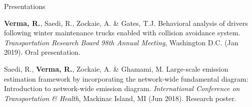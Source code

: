 \documentclass{CV} %
\begin{document}
\begin{rSection}{Presentations}
\begin{etaremune}
        \item \textbf{Verma, R.}, Saedi, R., Zockaie, A. \& Gates, T.J. Behavioral analysis of drivers following winter maintenance trucks enabled with collision avoidance system. \textit{Transportation Research Board 98th Annual Meeting}, Washington D.C. (Jan 2019). Oral presentation.

        \item Saedi, R., \textbf{Verma, R.}, Zockaie, A. \& Ghamami, M. Large-scale emission estimation framework by incorporating the network-wide fundamental diagram: Introduction to network-wide emission diagram. \textit{International Conference on Transportation \& Health}, Mackinac Island, MI (Jun 2018). Research poster.
    \end{etaremune}
\end{rSection}
\end{document}
